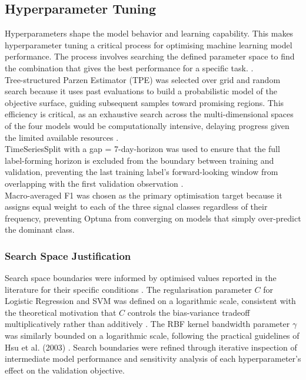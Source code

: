 \subsection{Hyperparameter Tuning}
Hyperparameters shape the model behavior and learning capability. This makes hyperparameter tuning a critical process for optimising machine learning model performance. The process involves searching the defined parameter space to find the combination that gives the best performance for a specific task. \cite{qureshiEvaluatingMachineLearning2025}.\\
Tree-structured Parzen Estimator (TPE) was selected over grid and random search because it uses past evaluations to build a probabilistic model of the objective surface, guiding subsequent samples toward promising regions. This efficiency is critical, as an exhaustive search across the multi-dimensional spaces of the four models would be computationally intensive, delaying progress given the limited available resources \cite{akibaOptunaNextgenerationHyperparameter2019}.\\
TimeSeriesSplit with a gap = 7-day-horizon was used to ensure that the full label-forming horizon is excluded from the boundary between training and validation, preventing the last training label's forward-looking window from overlapping with the first validation observation \cite{lopezdepradoAdvancesFinancialMachine2018}.\\
Macro-averaged F1 was chosen as the primary optimisation target because it assigns equal weight to each of the three signal classes regardless of their frequency, preventing Optuna from converging on models that simply over-predict the dominant class.
\subsubsection{Search Space Justification}
Search space boundaries were informed by optimised values reported in the literature for their specific conditions \cite{eddiengaiTimeSeriesPrediction2023, hasanliIntegratingHighDimensionalTechnical2025}. The regularisation parameter $C$ for Logistic Regression and SVM was defined on a logarithmic scale, consistent with the theoretical motivation that $C$ controls the bias-variance tradeoff multiplicatively rather than additively \cite{RegularizationPathL1, hsuPracticalGuideSupport2003}. The RBF kernel bandwidth parameter $\gamma$ was similarly bounded on a logarithmic scale, following the practical guidelines of Hsu et al. (2003) \cite{hsuPracticalGuideSupport2003, ScikitlearnExamplesSvm}. Search boundaries were refined through iterative inspection of intermediate model performance and sensitivity analysis of each hyperparameter's effect on the validation objective.

